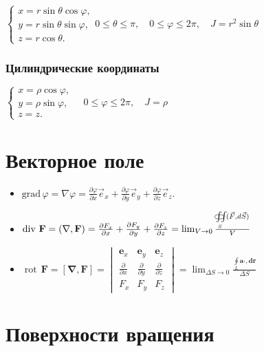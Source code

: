 ${\begin{cases}x=r\sin \theta \cos \varphi ,\\y=r\sin \theta \sin \varphi ,\\z=r\cos \theta .\end{cases}} 0 \le \theta \le \pi, \quad 0 \le \varphi \le 2\pi, \quad J=r^{2}\sin \theta $

\subsubsection{Цилиндрические координаты}
${\begin{cases}x=\rho \cos \varphi ,\\y=\rho \sin \varphi ,\\z=z.\end{cases}} \quad 0 \le \varphi \le 2\pi, \quad J = \rho$


\section{Векторное поле}

\begin{itemize}
	\item
	${\mathrm  {grad}}\,\varphi =\nabla \varphi ={\frac  {\partial \varphi }{\partial x}}{\vec  e}_{x}+{\frac  {\partial \varphi }{\partial y}}{\vec  e}_{y}+{\frac  {\partial \varphi }{\partial z}}{\vec  e}_{z}.$
	
	\item
	$\operatorname {div}\,{\mathbf  {F}}= (\nabla , {\mathbf  {F}})= {\frac  {\partial F_{x}}{\partial x}}+{\frac  {\partial F_{y}}{\partial y}}+{\pd{F_{z}}{z}} = \lim _{{V\rightarrow 0}}{\frac{\iint \limits _{S}\!\!\!\!\!\!\!\!\!\!\subset \!\supset \,({\vec  F},d{\vec  S})}{V}}$
	
	\item
	$\operatorname{rot}\, \mathbf{F} = [\mathbf{\nabla} , \mathbf{F}] = \begin{vmatrix} \mathbf{e}_x & \mathbf{e}_y & \mathbf{e}_z \\  
	\frac{\partial}{\partial x} & \frac{\partial}{\partial y} & \frac{\partial}{\partial z} 
	\\  F_x & F_y & F_z 
	\end{vmatrix} 
	= \lim_{\Delta S\to 0}\frac{\oint\limits_{L}\mathbf{ a\cdot , dr}}{\Delta S}$
	
\end{itemize}

\section{Поверхности вращения}

